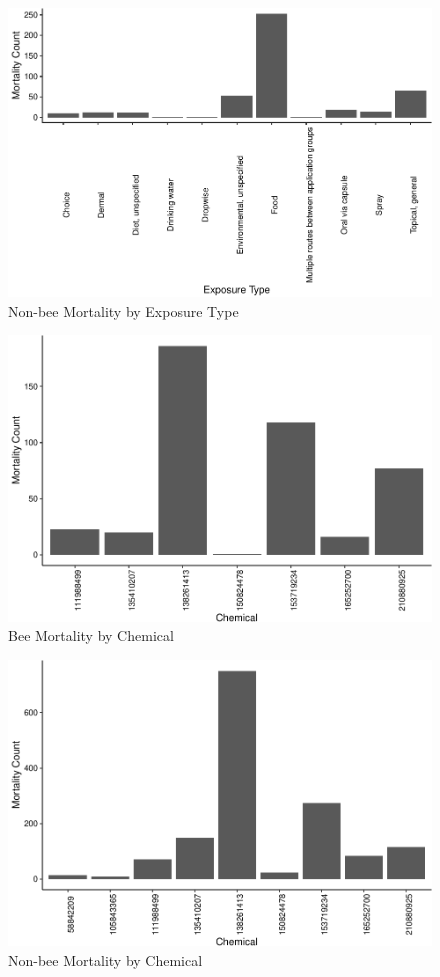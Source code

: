 \documentclass[
  12pt,
]{article}
\begin{document}
\begin{figure}
\centering
\includegraphics{Project_Template_files/figure-latex/unnamed-chunk-4-1.pdf}
\caption{Non-bee Mortality by Exposure Type}
\end{figure}

\begin{figure}
\centering
\includegraphics{Project_Template_files/figure-latex/unnamed-chunk-5-1.pdf}
\caption{Bee Mortality by Chemical}
\end{figure}

\begin{figure}
\centering
\includegraphics{Project_Template_files/figure-latex/unnamed-chunk-6-1.pdf}
\caption{Non-bee Mortality by Chemical}
\end{figure}
\end{document}
